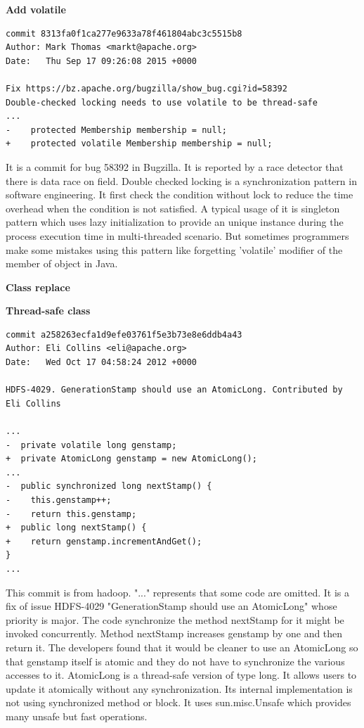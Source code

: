 \documentclass[conference]{IEEEtran}
\begin{document}
\textbf{Add volatile}

\begin{lstlisting}
commit 8313fa0f1ca277e9633a78f461804abc3c5515b8
Author: Mark Thomas <markt@apache.org>
Date:   Thu Sep 17 09:26:08 2015 +0000

Fix https://bz.apache.org/bugzilla/show_bug.cgi?id=58392
Double-checked locking needs to use volatile to be thread-safe
...
-    protected Membership membership = null;
+    protected volatile Membership membership = null;
\end{lstlisting}
It is a commit for bug 58392 in Bugzilla. It is reported by a race detector that there is data race on field. Double checked locking is a synchronization pattern in software engineering. It first check the condition without lock to reduce the time overhead when the condition is not satisfied. A typical usage of it is singleton pattern which uses lazy initialization to provide an unique instance during the process execution time in multi-threaded scenario. But sometimes programmers make some mistakes using this pattern like forgetting 'volatile' modifier of the member of object in Java.

\textbf{Class replace}



\textbf{Thread-safe class}
\begin{lstlisting}
commit a258263ecfa1d9efe03761f5e3b73e8e6ddb4a43
Author: Eli Collins <eli@apache.org>
Date:   Wed Oct 17 04:58:24 2012 +0000

HDFS-4029. GenerationStamp should use an AtomicLong. Contributed by Eli Collins

...
-  private volatile long genstamp;
+  private AtomicLong genstamp = new AtomicLong();
...
-  public synchronized long nextStamp() {
-    this.genstamp++;
-    return this.genstamp;
+  public long nextStamp() {
+    return genstamp.incrementAndGet();
}
...
\end{lstlisting}

This commit is from hadoop. "..." represents that some code are omitted. It is a fix of issue HDFS-4029 "GenerationStamp should use an AtomicLong" whose priority is major. The code synchronize the method nextStamp for it might be invoked concurrently. Method nextStamp increases genstamp by one and then return it. The developers found that it would be cleaner to use an AtomicLong so that genstamp itself is atomic and they do not have to synchronize the various accesses to it. AtomicLong is a thread-safe version of type long. It allows users to update it atomically without any synchronization. Its internal implementation is not using synchronized method or block. It uses sun.misc.Unsafe which provides many unsafe but fast operations.
\end{document}
